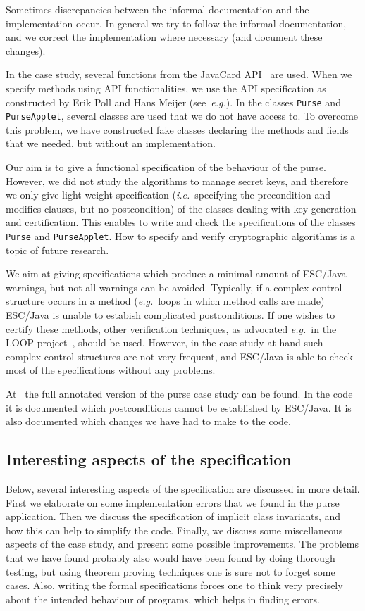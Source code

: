 \documentclass[a4paper]{llncs}
\begin{document}
Sometimes discrepancies between the informal documentation and the
implementation occur. In general we try to follow the informal
documentation, and we correct the implementation where necessary
(and document these changes). 

In the case study, several functions from the JavaCard
API~\cite{JavaCardAPI} are used. When we specify methods using API
functionalities, we use the API specification as constructed by Erik
Poll and Hans Meijer (see~\emph{e.g.}\cite{MeijerP01}).  In the
classes \texttt{Purse} and \texttt{PurseApplet}, several classes are
used that we do not have access to. To overcome this problem, we have
constructed fake classes declaring the methods and fields that we
needed, but without an implementation.

Our aim is to give a functional specification of the behaviour of the
purse. However, we did not study the algorithms to manage secret keys,
and therefore we only give light weight specification
(\emph{i.e.}~specifying the precondition and modifies clauses, but no
postcondition) of the classes dealing with key generation and
certification. This enables to write and check the specifications of
the classes \texttt{Purse} and \texttt{PurseApplet}. How to specify
and verify cryptographic algorithms is a topic of future research.

We aim at giving specifications which produce a minimal amount of
ESC/Java warnings, but not all warnings can be avoided. Typically, if
a complex control structure occurs in a method (\emph{e.g.}~loops in
which method calls are made) ESC/Java is unable to estabish
complicated postconditions. If one wishes to certify these methods,
other verification techniques, as advocated \emph{e.g.}~in the LOOP
project~\cite{LOOPUrl}, should be used. However, in the case study at
hand such complex control structures are not very frequent, and
ESC/Java is able to check most of the specifications without any
problems.

At~\cite{CatanoH01Url} the full annotated version of the purse case
study can be found. In the code it is documented which postconditions
cannot be established by ESC/Java. It is also documented which changes 
we have had to make to the code.



\subsection{Interesting aspects of the specification}\label{SectSpecDetails}
Below, several interesting aspects of the specification are discussed
in more detail. First we elaborate on some implementation errors
that we found in the purse application.  Then we discuss the
specification of implicit class invariants, and how this can help to
simplify the code. Finally, we discuss some miscellaneous aspects of
the case study, and present some possible improvements. The problems
that we have found probably also would have been found by doing
thorough testing, but using theorem proving techniques one is sure not
to forget some cases. Also, writing the formal specifications forces
one to think very precisely about the intended behaviour of programs,
which helps in finding errors.
\end{document}

